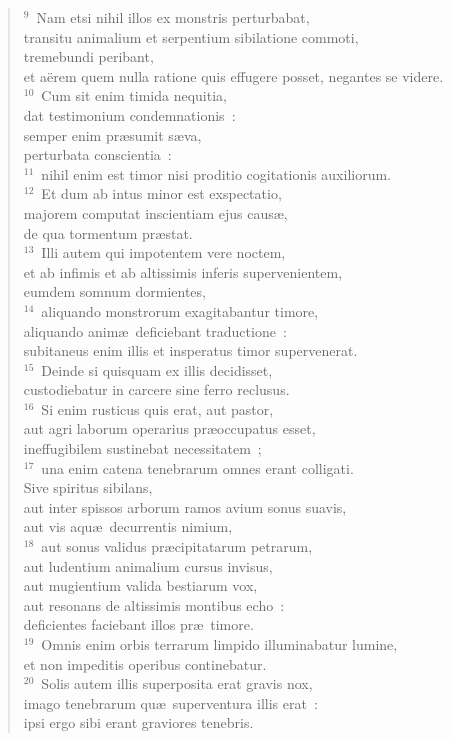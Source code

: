 \begin{flushleft}
\begin{verse}
${}^{9}$~Nam etsi nihil illos ex monstris perturbabat,\\ transitu animalium et serpentium sibilatione commoti,\\ tremebundi peribant,\\ et a\"erem quem nulla ratione quis effugere posset, negantes se videre.\\
${}^{10}$~Cum sit enim timida nequitia,\\ dat testimonium condemnationis~:\\ semper enim pr\ae sumit s\ae va,\\ perturbata conscientia~:\\
${}^{11}$~nihil enim est timor nisi proditio cogitationis auxiliorum.\\
${}^{12}$~Et dum ab intus minor est exspectatio,\\ majorem computat inscientiam ejus caus\ae ,\\ de qua tormentum pr\ae stat.\\
${}^{13}$~Illi autem qui impotentem vere noctem,\\ et ab infimis et ab altissimis inferis supervenientem,\\ eumdem somnum dormientes,\\
${}^{14}$~aliquando monstrorum exagitabantur timore,\\ aliquando anim\ae\ deficiebant traductione~:\\ subitaneus enim illis et insperatus timor supervenerat.\\
${}^{15}$~Deinde si quisquam ex illis decidisset,\\ custodiebatur in carcere sine ferro reclusus.\\
${}^{16}$~Si enim rusticus quis erat, aut pastor,\\ aut agri laborum operarius pr\ae occupatus esset,\\ ineffugibilem sustinebat necessitatem~;\\
${}^{17}$~una enim catena tenebrarum omnes erant colligati.\\ Sive spiritus sibilans,\\ aut inter spissos arborum ramos avium sonus suavis,\\ aut vis aqu\ae\ decurrentis nimium,\\
${}^{18}$~aut sonus validus pr\ae cipitatarum petrarum,\\ aut ludentium animalium cursus invisus,\\ aut mugientium valida bestiarum vox,\\ aut resonans de altissimis montibus echo~:\\ deficientes faciebant illos pr\ae\ timore.\\
${}^{19}$~Omnis enim orbis terrarum limpido illuminabatur lumine,\\ et non impeditis operibus continebatur.\\
${}^{20}$~Solis autem illis superposita erat gravis nox,\\ imago tenebrarum qu\ae\ superventura illis erat~:\\ ipsi ergo sibi erant graviores tenebris.\end{verse}\end{flushleft}


